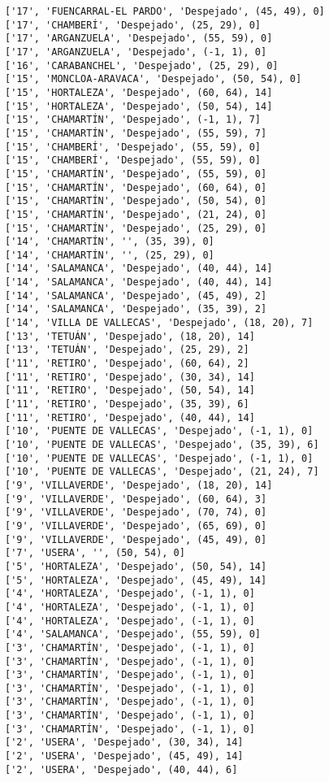 \documentclass[11pt]{article}
\begin{document}
\begin{Verbatim}[commandchars=\\\{\}]
['17', 'FUENCARRAL-EL PARDO', 'Despejado', (45, 49), 0]
['17', 'CHAMBERÍ', 'Despejado', (25, 29), 0]
['17', 'ARGANZUELA', 'Despejado', (55, 59), 0]
['17', 'ARGANZUELA', 'Despejado', (-1, 1), 0]
['16', 'CARABANCHEL', 'Despejado', (25, 29), 0]
['15', 'MONCLOA-ARAVACA', 'Despejado', (50, 54), 0]
['15', 'HORTALEZA', 'Despejado', (60, 64), 14]
['15', 'HORTALEZA', 'Despejado', (50, 54), 14]
['15', 'CHAMARTÍN', 'Despejado', (-1, 1), 7]
['15', 'CHAMARTÍN', 'Despejado', (55, 59), 7]
['15', 'CHAMBERÍ', 'Despejado', (55, 59), 0]
['15', 'CHAMBERÍ', 'Despejado', (55, 59), 0]
['15', 'CHAMARTÍN', 'Despejado', (55, 59), 0]
['15', 'CHAMARTÍN', 'Despejado', (60, 64), 0]
['15', 'CHAMARTÍN', 'Despejado', (50, 54), 0]
['15', 'CHAMARTÍN', 'Despejado', (21, 24), 0]
['15', 'CHAMARTÍN', 'Despejado', (25, 29), 0]
['14', 'CHAMARTÍN', '', (35, 39), 0]
['14', 'CHAMARTÍN', '', (25, 29), 0]
['14', 'SALAMANCA', 'Despejado', (40, 44), 14]
['14', 'SALAMANCA', 'Despejado', (40, 44), 14]
['14', 'SALAMANCA', 'Despejado', (45, 49), 2]
['14', 'SALAMANCA', 'Despejado', (35, 39), 2]
['14', 'VILLA DE VALLECAS', 'Despejado', (18, 20), 7]
['13', 'TETUÁN', 'Despejado', (18, 20), 14]
['13', 'TETUÁN', 'Despejado', (25, 29), 2]
['11', 'RETIRO', 'Despejado', (60, 64), 2]
['11', 'RETIRO', 'Despejado', (30, 34), 14]
['11', 'RETIRO', 'Despejado', (50, 54), 14]
['11', 'RETIRO', 'Despejado', (35, 39), 6]
['11', 'RETIRO', 'Despejado', (40, 44), 14]
['10', 'PUENTE DE VALLECAS', 'Despejado', (-1, 1), 0]
['10', 'PUENTE DE VALLECAS', 'Despejado', (35, 39), 6]
['10', 'PUENTE DE VALLECAS', 'Despejado', (-1, 1), 0]
['10', 'PUENTE DE VALLECAS', 'Despejado', (21, 24), 7]
['9', 'VILLAVERDE', 'Despejado', (18, 20), 14]
['9', 'VILLAVERDE', 'Despejado', (60, 64), 3]
['9', 'VILLAVERDE', 'Despejado', (70, 74), 0]
['9', 'VILLAVERDE', 'Despejado', (65, 69), 0]
['9', 'VILLAVERDE', 'Despejado', (45, 49), 0]
['7', 'USERA', '', (50, 54), 0]
['5', 'HORTALEZA', 'Despejado', (50, 54), 14]
['5', 'HORTALEZA', 'Despejado', (45, 49), 14]
['4', 'HORTALEZA', 'Despejado', (-1, 1), 0]
['4', 'HORTALEZA', 'Despejado', (-1, 1), 0]
['4', 'HORTALEZA', 'Despejado', (-1, 1), 0]
['4', 'SALAMANCA', 'Despejado', (55, 59), 0]
['3', 'CHAMARTÍN', 'Despejado', (-1, 1), 0]
['3', 'CHAMARTÍN', 'Despejado', (-1, 1), 0]
['3', 'CHAMARTÍN', 'Despejado', (-1, 1), 0]
['3', 'CHAMARTÍN', 'Despejado', (-1, 1), 0]
['3', 'CHAMARTÍN', 'Despejado', (-1, 1), 0]
['3', 'CHAMARTÍN', 'Despejado', (-1, 1), 0]
['3', 'CHAMARTÍN', 'Despejado', (-1, 1), 0]
['2', 'USERA', 'Despejado', (30, 34), 14]
['2', 'USERA', 'Despejado', (45, 49), 14]
['2', 'USERA', 'Despejado', (40, 44), 6]

\end{Verbatim}
\end{document}

